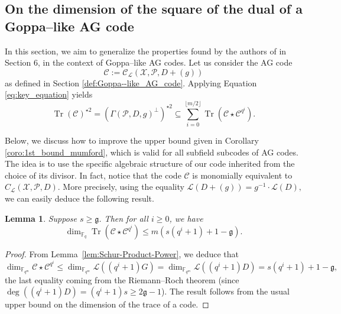 \documentclass[a4paper]{amsart}
\newtheorem{lemma}[thm]{Lemma}
\theoremstyle{definition}
\theoremstyle{remark}
\DeclareMathOperator{\trace}{Tr}
\newcommand{\calP}{\mathcal{P}}
\newcommand{\calL}{\mathcal{L}}
\newcommand{\calC}{\mathcal{C}}
\newcommand{\calX}{\mathcal{X}}
\newcommand{\fqm}{\mathbb{F}_{q^m}}
\newcommand{\fq}{\mathbb{F}_{q}}
\newcommand{\Tr}[1]{\trace\!\left(#1\right)}
\begin{document}
\subsection{On the dimension of the square of the dual of a Goppa--like AG code} \label{section:1st_improvement}
In this section, we aim to generalize the properties found by the authors of \cite{MT21} in Section 6, in the context of Goppa--like AG codes. Let us consider the AG code 
$$\calC := \calC_{\calL}(\calX,\calP,D+(g))$$
as defined in Section \ref{def:Goppa--like_AG_code}. Applying Equation \eqref{eq:key_equation} yields   
\begin{equation} \label{eq:key_equation_Goppa--like} 
\Tr{\calC}^{\star 2} = (\Gamma(\calP,D,g)^{\perp})^{\star2} \subseteq \sum\limits_{i=0}^{\lfloor{m/2} \rfloor} \Tr{\calC\star \calC^{q^i}}.
\end{equation}

Below, we discuss how to improve the upper bound given in Corollary \ref{coro:1st_bound_mumford}, which is valid for all subfield subcodes of AG codes. The idea is to use the specific algebraic structure of our code inherited from the choice of its divisor.
\noindent In fact, notice that the code $\calC$ is monomially equivalent to $C_{\calL}(\calX,\calP,D)$. 
More precisely, using the equality $\calL(D+(g)) = g^{-1} \cdot \calL(D),$
we can easily deduce the following result.

\begin{lemma} \label{lem:bound_dim_Tr(C*C^q^i)}
  Suppose $s \geq \mathfrak{g}$. Then for all $i \geq 0$, we have 
   $$\dim_{\fq} \Tr{\calC\star \calC^{q^i}} \leq m\left(s\left(q^i+1\right)+1-\mathfrak{g}\right).$$
\end{lemma}
\begin{proof}
From Lemma~\ref{lem:Schur-Product-Power}, we deduce that 
\[\dim_{\fqm} \calC\star \calC^{q^i} \leq \dim_{\fqm} \calL((q^i+1)G) = \dim_{\fqm} \calL((q^i+1)D) = s(q^i+1)+1-\mathfrak{g},\]
the last equality coming from the Riemann--Roch theorem (since $\deg \left((q^i+1)D\right) =(q^i+1)s \geq 2\mathfrak{g}-1$). The result follows from the usual upper bound on the dimension of the trace of a code. 
\end{proof}
\end{document}
